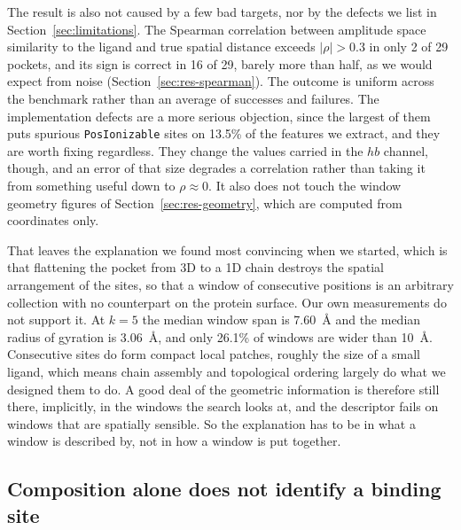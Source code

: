 The result is also not caused by a few bad targets, nor by the defects we list in
Section~\ref{sec:limitations}. The Spearman correlation between amplitude space
similarity to the ligand and true spatial distance exceeds $|\rho| > 0.3$ in only 2 of 29
pockets, and its sign is correct in 16 of 29, barely more than half, as we would expect
from noise (Section~\ref{sec:res-spearman}). The outcome is uniform across the benchmark
rather than an average of successes and failures. The implementation defects are a more
serious objection, since the largest of them puts spurious \texttt{PosIonizable} sites on
13.5\% of the features we extract, and they are worth fixing regardless. They change the
values carried in the $hb$ channel, though, and an error of that size degrades a
correlation rather than taking it from something useful down to $\rho \approx 0$. It
also does not touch the window geometry figures of Section~\ref{sec:res-geometry}, which
are computed from coordinates only.

That leaves the explanation we found most convincing when we started, which is that
flattening the pocket from 3D to a 1D chain destroys the spatial arrangement of the
sites, so that a window of consecutive positions is an arbitrary collection with no
counterpart on the protein surface. Our own measurements do not support it. At $k=5$ the
median window span is 7.60~\AA{} and the median radius of gyration is 3.06~\AA{}, and only
26.1\% of windows are wider than 10~\AA{}. Consecutive sites do form compact local
patches, roughly the size of a small ligand, which means chain assembly and topological
ordering largely do what we designed them to do. A good deal of the geometric information
is therefore still there, implicitly, in the windows the search looks at, and the
descriptor fails on windows that are spatially sensible. So the explanation has to be in
what a window is described by, not in how a window is put together.

\subsection{Composition alone does not identify a binding site}
\label{sec:why-mechanism}

